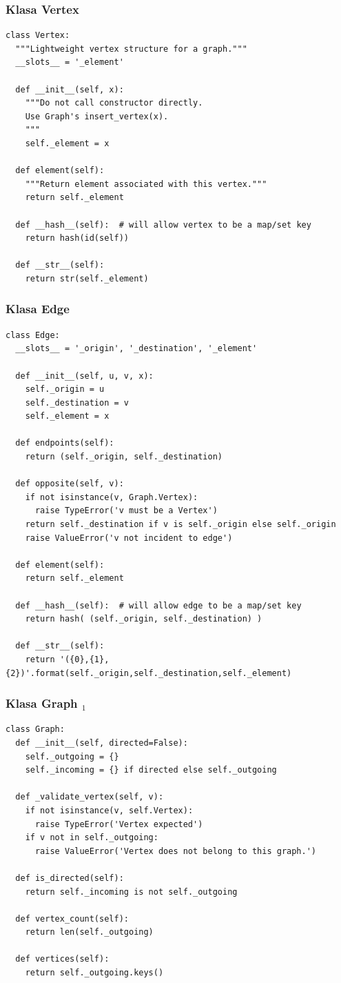 \documentclass[compress]{beamer}
\begin{document}
\begin{frame}
  \frametitle{Klasa Vertex}
\begin{verbatim}
class Vertex:
  """Lightweight vertex structure for a graph."""
  __slots__ = '_element'

  def __init__(self, x):
    """Do not call constructor directly. 
    Use Graph's insert_vertex(x).
    """
    self._element = x

  def element(self):
    """Return element associated with this vertex."""
    return self._element

  def __hash__(self):  # will allow vertex to be a map/set key
    return hash(id(self))

  def __str__(self):
    return str(self._element)
\end{verbatim}
\end{frame}

\begin{frame}
  \frametitle{Klasa Edge}
\begin{verbatim}
class Edge:
  __slots__ = '_origin', '_destination', '_element'

  def __init__(self, u, v, x):
    self._origin = u
    self._destination = v
    self._element = x

  def endpoints(self):
    return (self._origin, self._destination)

  def opposite(self, v):
    if not isinstance(v, Graph.Vertex):
      raise TypeError('v must be a Vertex')
    return self._destination if v is self._origin else self._origin
    raise ValueError('v not incident to edge')

  def element(self):
    return self._element

  def __hash__(self):  # will allow edge to be a map/set key
    return hash( (self._origin, self._destination) )

  def __str__(self):
    return '({0},{1},{2})'.format(self._origin,self._destination,self._element)
\end{verbatim}
\end{frame}

\begin{frame}
  \frametitle{Klasa Graph $_1$}
\begin{verbatim}
class Graph:
  def __init__(self, directed=False):
    self._outgoing = {}
    self._incoming = {} if directed else self._outgoing

  def _validate_vertex(self, v):
    if not isinstance(v, self.Vertex):
      raise TypeError('Vertex expected')
    if v not in self._outgoing:
      raise ValueError('Vertex does not belong to this graph.')
    
  def is_directed(self):
    return self._incoming is not self._outgoing

  def vertex_count(self):
    return len(self._outgoing)

  def vertices(self):
    return self._outgoing.keys()
\end{verbatim}
\end{frame}
\end{document}
